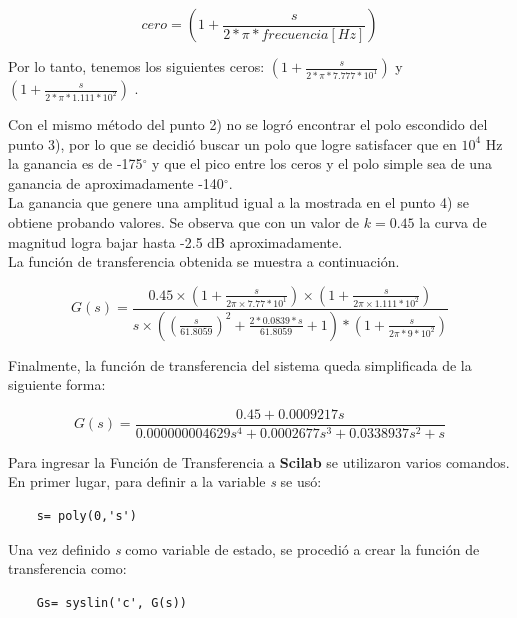 \documentclass[12pt,letterpaper]{article}
\begin{document}
\begin{equation}
    cero = (1+\frac{s}{2*\pi*frecuencia[Hz]})
\end{equation}

\bigskip

Por lo tanto, tenemos los siguientes ceros: $(1+\frac{s}{2*\pi*7.777*10^1})$ y $(1+\frac{s}{2*\pi*1.111*10^{2}})$ .

\bigskip

Con el mismo método del punto 2) no se logró encontrar el polo escondido del punto 3), por lo que se decidió buscar un polo que logre satisfacer que en $10^4$ Hz la ganancia es de -175$^{\circ}$  y que el pico entre los ceros y el polo simple sea de una ganancia de aproximadamente -140$^{\circ}$.\\

La ganancia que genere una amplitud igual a la mostrada en el punto 4) se obtiene probando valores. Se observa que con un valor de $k = 0.45$ la curva de magnitud logra bajar hasta -2.5 dB aproximadamente.\\

La función de transferencia obtenida se muestra a continuación.

\begin{equation}
    G(s) = \frac{0.45\times(1+\frac{s}{2\pi\times7.77*10^1})\times(1+\frac{s}{2\pi\times1.111*10^2})}{s  \times  ((\frac{s}{61.8059})^2 + \frac{2*0.0839*s}{61.8059} +1) * (1+\frac{s}{2\pi*9*10^2})}
\end{equation}

\bigskip

Finalmente, la función de transferencia del sistema queda simplificada de la siguiente forma:

\begin{equation}
    G(s) = \frac{0.45+ 0.0009217s}{0.000000004629s^4+0.0002677s^3+0.0338937s^2 +s}
\end{equation}

\bigskip 

Para ingresar la Función de Transferencia a \textbf{Scilab} se utilizaron varios comandos. En primer lugar, para definir a la variable \textit{s} se usó:

\begin{verbatim}
    s= poly(0,'s')
\end{verbatim}

Una vez definido \textit{s} como variable de estado, se procedió a crear la función de transferencia como:

\begin{verbatim}
    Gs= syslin('c', G(s))
\end{verbatim}
\end{document}
